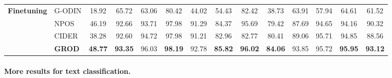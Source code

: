 \documentclass{article}
\theoremstyle{plain}
\theoremstyle{definition}
\theoremstyle{remark}
\begin{document}
\begin{table}[!t]
{\begin{tabular}{l l c c c c c c c c c c c c}
\midrule
\textbf{Finetuning} & \textsc{G-ODIN}
& 18.92 & 65.72 & 63.06 & 80.42 & 44.02 & 54.43
& 82.42 & 38.73 & 63.91 & 57.94 & 64.61 & 61.52 \\
& \textsc{NPOS}
& 46.19 & 92.66 & 93.71 & 97.98 & 91.29 & 84.37
& 95.69 & 79.42 & 87.69 & 94.65 & 94.16 & 90.32 \\
& \textsc{CIDER}
& 38.28 & 92.60 & 94.72 & 97.98 & 91.21 & 82.96
& 82.77 & 80.41 & 89.06 & 95.71 & 94.85 & 88.56 \\
\rowcolor{gray!10} & \textsc{\textbf{GROD}}
& \textbf{48.77} & \textbf{93.35} & 96.03 & \textbf{98.19} & 92.78 & \textbf{85.82}
& \textbf{96.02} & \textbf{84.06} & 93.85 & 95.72 & \textbf{95.95} & \textbf{93.12} \\


\bottomrule
\end{tabular}
}
\vspace{-0.5em}
\end{table}




\paragraph{More results for text classification. }
\end{document}
